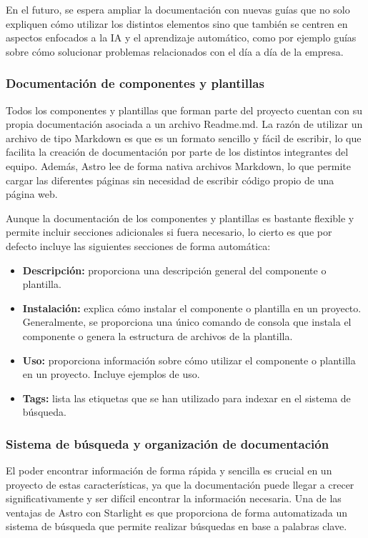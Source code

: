 En el futuro, se espera ampliar la documentación con nuevas guías
que no solo expliquen cómo utilizar los distintos elementos sino que
también se centren en aspectos enfocados a la IA y el aprendizaje
automático, como por ejemplo guías sobre cómo solucionar problemas
relacionados con el día a día de la empresa.

\subsubsection{Documentación de componentes y plantillas}
Todos los componentes y plantillas que forman parte del proyecto
cuentan con su propia documentación asociada a un archivo Readme.md.
La razón de utilizar un archivo de tipo Markdown es que es un formato
sencillo y fácil de escribir, lo que facilita la creación de documentación
por parte de los distintos integrantes del equipo. Además, Astro
lee de forma nativa archivos Markdown, lo que permite cargar las
diferentes páginas sin necesidad de escribir código propio de una
página web.\medskip

Aunque la documentación de los componentes y plantillas es bastante
flexible y permite incluir secciones adicionales si fuera necesario,
lo cierto es que por defecto incluye las siguientes secciones de forma
automática:

\begin{itemize}
    \item \textbf{Descripción:} proporciona una descripción general del
    componente o plantilla.
    \item \textbf{Instalación:} explica cómo instalar el componente o plantilla
    en un proyecto. Generalmente, se proporciona una único comando de consola que
    instala el componente o genera la estructura de archivos de la plantilla. 
    \item \textbf{Uso:} proporciona información sobre cómo utilizar el componente
    o plantilla en un proyecto. Incluye ejemplos de uso.
    \item \textbf{Tags:} lista las etiquetas que se han utilizado para indexar en
    el sistema de búsqueda.
\end{itemize}


\subsubsection{Sistema de búsqueda y organización de documentación}
El poder encontrar información de forma rápida y sencilla es crucial
en un proyecto de estas características, ya que la documentación
puede llegar a crecer significativamente y ser difícil encontrar
la información necesaria. Una de las ventajas de Astro con Starlight
es que proporciona de forma automatizada un sistema de búsqueda 
que permite realizar búsquedas en base a palabras clave.\medskip

